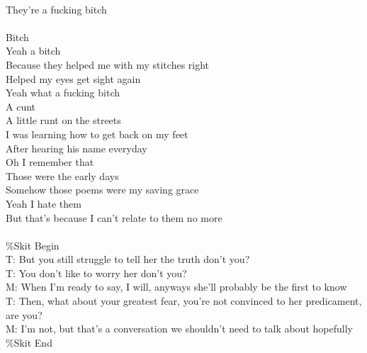 \documentclass[12pt, b5paper, oneside]{book}
\begin{document}
\\They're a fucking bitch
%
\\\\Bitch
\\Yeah a bitch
\\Because they helped me with my stitches right
\\Helped my eyes get sight again
\\Yeah what a fucking bitch
\\A cunt
\\A little runt on the streets
\\I was learning how to get back on my feet
\\After hearing his name everyday
\\Oh I remember that
\\Those were the early days
\\Somehow those poems were my saving grace
\\Yeah I hate them
\\But that's because I can't relate to them no more
%
\\\\\%Skit Begin
\\T: But you still struggle to tell her the truth don't you?
\\T: You don't like to worry her don't you?
\\M: When I'm ready to say, I will, anyways she'll probably be the first to know
\\T: Then, what about your greatest fear, you're not convinced to her predicament, are you?
\\M: I'm not, but that's a conversation we shouldn't need to talk about hopefully
\\\%Skit End



\newpage
\end{document}
